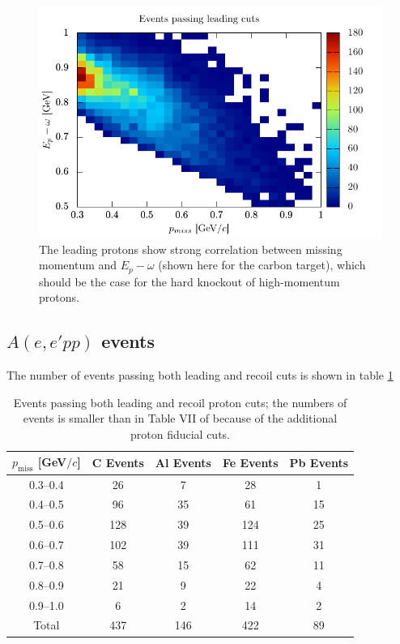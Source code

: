 \documentclass{article}
\begin{document}
\begin{figure}[htpb]
\centering
\includegraphics{pmiss_e1_ep.pdf}
\caption[Leading proton $p_\text{miss}$ vs. $E_1$]{
The leading protons show strong correlation between missing momentum
and $E_p - \omega$ (shown here for the carbon target), which should
be the case for the hard knockout of high-momentum protons.
\label{fig:ep_pm_e1}}
\end{figure}

\subsection{$A(e,e'pp)$ events}

The number of events passing both leading and recoil cuts is shown in table \ref{tab:recoil}

\begin{table}[h]
\centering
\begin{tabular}{c c c c c}
\hline
\hline
$p_\text{miss}$ [GeV$/c$] & C Events & Al Events & Fe Events & Pb Events\\
\hline
0.3--0.4  &  26 &  7 &  28 &  1 \\
0.4--0.5  &  96 & 35 &  61 & 15 \\
0.5--0.6  & 128 & 39 & 124 & 25 \\
0.6--0.7  & 102 & 39 & 111 & 31 \\
0.7--0.8  &  58 & 15 &  62 & 11 \\
0.8--0.9  &  21 &  9 &  22 &  4 \\
0.9--1.0  &   6 &  2 &  14 &  2 \\
\hline
Total & 437 & 146 & 422 & 89 \\
\hline
\end{tabular}
\caption{\label{tab:recoil} Events passing both leading and recoil proton cuts; the numbers
of events is smaller than in Table VII of \cite{Or:note} because of the additional proton
fiducial cuts.}
\end{table}
\end{document}
